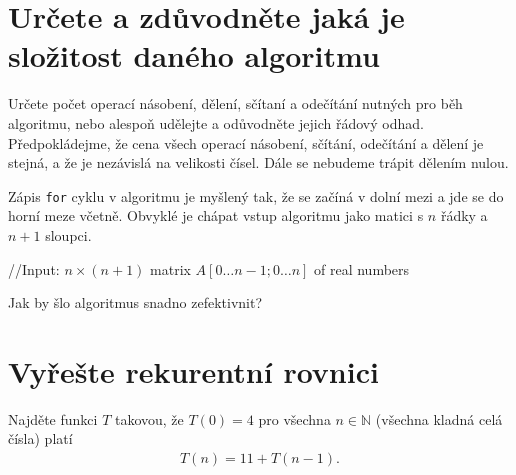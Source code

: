 \documentclass[12pt,oneside]{article}
\begin{document}
	\section{Určete a zdůvodněte jaká je složitost daného algoritmu}
	Určete počet operací násobení, dělení, sčítaní a odečítání nutných pro běh algoritmu, nebo alespoň udělejte a odůvodněte jejich řádový odhad.
	Předpokládejme, že cena všech operací násobení, sčítání, odečítání a dělení je stejná, a že je nezávislá na velikosti čísel.
	Dále se nebudeme trápit dělením nulou.

	Zápis \verb|for| cyklu v algoritmu je myšlený tak, že se začíná v dolní mezi a jde se do horní meze včetně.
	Obvyklé je chápat vstup algoritmu jako matici s $n$ řádky a $n+1$ sloupci.
	\begin{algorithm}[h]
		\caption{What does this do?}
		\DontPrintSemicolon
		//Input: $n\times (n+1)$ matrix $A[0\dots n-1; 0 \dots n]$ of real numbers \;
	\end{algorithm}

	Jak by šlo algoritmus snadno zefektivnit?

	\section{Vyřešte rekurentní rovnici}
	Najděte funkci $T$ takovou, že $T(0) = 4$ pro všechna $n \in \mathbb{N}$ (všechna kladná celá čísla) platí
	\begin{align}
		T(n) = 11 + T(n-1).
	\end{align}
\end{document}

